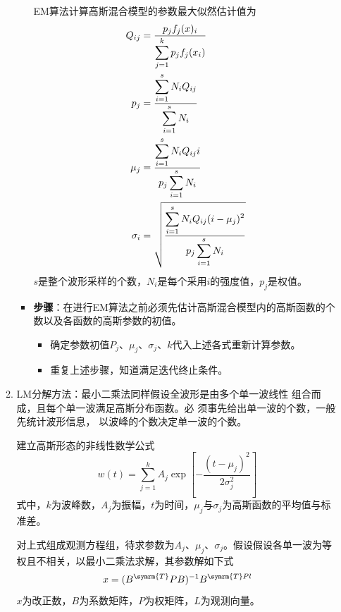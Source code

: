 \begin{enumerate}
\begin{enumerate}
\begin{itemize}
							EM算法计算高斯混合模型的参数最大似然估计值为
							\begin{align}
							Q_{ij} & = \dfrac{p_j f_j(x)_i}{\displaystyle{\sum_{j=1}^{k} p_j f_j(x_i)}} \\
							   p_j & = \dfrac{\displaystyle{\sum_{i=1}^{s} N_i Q_{ij}}}{\displaystyle{\sum_{i=1}^{s} N_i}} \\
							   \mu_j & = \dfrac{\displaystyle{{\sum_{i=1}^{s} N_i Q_{ij} i}}}{\displaystyle{{p_j \sum_{i=1}^{s} N_i}}} \\
							 \sigma_i & = \sqrt{\dfrac{\displaystyle{{\sum_{i=1}^{s} N_i Q_{ij} (i - \mu_j)^2}}}{\displaystyle{{p_j \sum_{i=1}^{s} N_i}}}}
							\end{align}
							$ s $是整个波形采样的个数，$ N_i $是每个采用$ i $的强度值，$ p_j $是权值。
						\item \textbf{步骤}：在进行EM算法之前必须先估计高斯混合模型内的高斯函数的个数以及各函数的高斯参数的初值。
							\begin{itemize}
								\item 确定参数初值$ P_j $、$ \mu_j $、$ \sigma_j $、$ k $代入上述各式重新计算参数。
								\item 重复上述步骤，知道满足迭代终止条件。
							\end{itemize}
					\end{itemize}
				\item {\kaishu LM分解方法}：最小二乘法同样假设全波形是由多个单一波线性
					组合而成，且每个单一波满足高斯分布函数。必
					须事先给出单一波的个数，一般先统计波形信息，
					以波峰的个数决定单一波的个数。
					
					建立高斯形态的非线性数学公式
					\begin{equation}
					w(t) = \sum_{j=1}^{k} A_j \exp \left[ - \dfrac{(t-\mu_j)^2}{2\sigma_j^2} \right]
					\end{equation}
					式中，$ k $为波峰数，$ A_j $为振幅，$ t $为时间，$ \mu_j $与$ \sigma_j $为高斯函数的平均值与标准差。
					
					对上式组成观测方程组，待求参数为$ A_j $、$ \mu_j $、$ \sigma_j $。假设假设各单一波为等权且不相关，以最小二乘法求解，其参数解如下式
					\begin{equation}
					x = (B^{\symrm{T}}PB)^{-1}B^{\symrm{T}Pl}
					\end{equation}
					$ x $为改正数，$ B $为系数矩阵，$ P $为权矩阵，$ L $为观测向量。
			\end{enumerate}
\end{enumerate}

